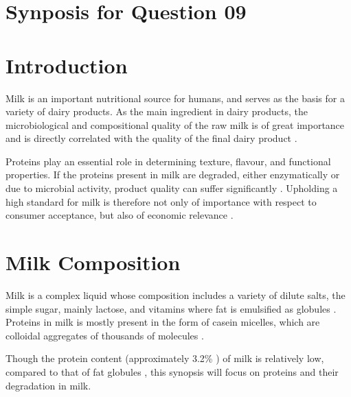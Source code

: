 \setcounter{chapter}{2}
\setcounter{section}{0}
\section*{Synposis for Question 09}

\section{Introduction}
Milk is an important nutritional source for humans, and serves as the basis for a variety of dairy products. As the main ingredient in dairy products, the microbiological and compositional quality of  the raw milk is of great importance and is directly correlated with the quality of the final dairy product \cite*{a01_protein_degradation_in_bovine_milk}. 

Proteins play an essential role in determining texture, flavour, and functional properties. If the proteins present in milk are degraded, either enzymatically or due to microbial activity, product quality can suffer significantly \cite*{a02_proteases_and_protein_degradation}. Upholding a high standard for milk is therefore not only of importance with respect to consumer acceptance, but also of economic relevance \cite*{a01_protein_degradation_in_bovine_milk}.


\section{Milk Composition}
Milk is a complex liquid whose composition includes a variety of dilute salts, the simple sugar, mainly lactose, and vitamins where fat is emulsified as globules \cite*{a04_bovine_milk_in_human_nutrition}. Proteins in milk is mostly present in the form of casein micelles, which are colloidal aggregates of thousands of molecules \cite*{b01_milk_biochemistry}.

\vspace{0.5em}
Though the protein content (approximately 3.2\% \cite*{s09_milk_secretion_and_ejection}) of milk is relatively low, compared to that of fat globules \cite*{b01_milk_biochemistry}, this synopsis will focus on proteins and their degradation in milk.

